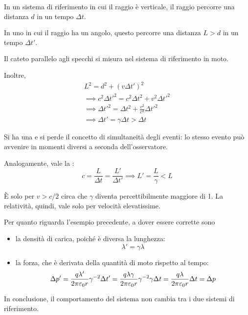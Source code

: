 In un sistema di riferimento in cui il raggio è verticale, il raggio percorre una distanza $d$ in un tempo $\Delta t$.

In uno in cui il raggio ha un angolo, questo percorre una distanza $L > d$ in un tempo $\Delta t'$.

Il cateto parallelo agli specchi si misura nel sistema di riferimento in moto.

Inoltre,
\begin{gather}
    L^2 = d^2 + (v \Delta t')^2 \\
    \implies c^2 \Delta t'^2 = c^2 \Delta t^2 + v^2 \Delta t'^2 \\
    \implies \Delta t'^2 = \Delta t^2 + \frac{v^2}{c^2} \Delta t'^2 \\
    \implies \Delta t' = \gamma \Delta t > \Delta t
\end{gather}

Si ha una  e si perde il concetto di simultaneità degli eventi: lo stesso evento può avvenire in momenti diversi a seconda dell'osservatore.

Analogamente, vale la :
\begin{equation}
    c = \frac{L}{\Delta t} = \frac{L'}{\Delta t'}
    \implies L' = \frac{L}{\gamma} < L
\end{equation}

È solo per $v > c/2$ circa che $\gamma$ diventa percettibilmente maggiore di 1.
La relatività, quindi, vale solo per velocità elevatissime.

Per quanto riguarda l'esempio precedente, a dover essere corrette sono
\begin{itemize}
    \item la densità di carica, poiché è diversa la lunghezza:
    \begin{equation}
        \lambda' = \gamma \lambda
    \end{equation}
    \item la forza, che è derivata della quantità di moto rispetto al tempo:
    \begin{equation}
        \Delta p' = \frac{q \lambda'}{2\pi \varepsilon_0 r} \gamma^{-2} \Delta t'
        = \frac{q \lambda \gamma}{2\pi \varepsilon_0 r} \gamma^{-2} \gamma \Delta t
        = \frac{q \lambda}{2\pi \varepsilon_0 r} \Delta t
        = \Delta p
    \end{equation}
\end{itemize}

In conclusione, il comportamento del sistema non cambia tra i due sistemi di riferimento.

